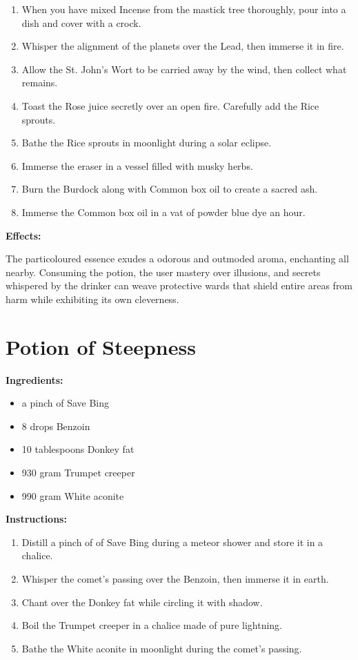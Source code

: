 \documentclass{article}
\begin{document}
\begin{enumerate}
  \item When you have mixed Incense from the mastick tree thoroughly, pour into a dish and cover with a crock.
  \item Whisper the alignment of the planets over the Lead, then immerse it in fire.
  \item Allow the St. John's Wort to be carried away by the wind, then collect what remains.
  \item Toast the Rose juice secretly over an open fire. Carefully add the Rice sprouts.
  \item Bathe the Rice sprouts in moonlight during a solar eclipse.
  \item Immerse the eraser in a vessel filled with musky herbs.
  \item Burn the Burdock along with Common box oil to create a sacred ash.
  \item Immerse the Common box oil in a vat of powder blue dye an hour.
\end{enumerate}

\textbf{Effects:}

The particoloured essence exudes a odorous and outmoded aroma, enchanting all nearby. Consuming the potion, the user mastery over illusions, and secrets whispered by the drinker can weave protective wards that shield entire areas from harm while exhibiting its own cleverness.

\newpage
\section*{Potion of Steepness}

\textbf{Ingredients:}

\begin{itemize}
  \item a pinch of Save Bing
  \item 8 drops Benzoin
  \item 10 tablespoons Donkey fat
  \item 930 gram Trumpet creeper
  \item 990 gram White aconite
\end{itemize}

\textbf{Instructions:}

\begin{enumerate}
  \item Distill a pinch of of Save Bing during a meteor shower and store it in a chalice.
  \item Whisper the comet’s passing over the Benzoin, then immerse it in earth.
  \item Chant over the Donkey fat while circling it with shadow.
  \item Boil the Trumpet creeper in a chalice made of pure lightning.
  \item Bathe the White aconite in moonlight during the comet’s passing.
\end{enumerate}
\end{document}
